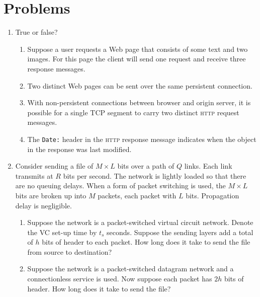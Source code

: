 \documentclass[12pt,a4paper]{article}
\begin{document}
\section{Problems}

\begin{enumerate}

  \item True or false?
  \begin{enumerate}

    \item Suppose a user requests a Web page that consists of some text
      and two images. For this page the client will send one request
      and receive three response messages.

    \item Two distinct Web pages can be sent over the same persistent
      connection.

    \item With non-persistent connections between browser and origin
      ser\-ver, it is possible for a single TCP segment to carry two
      distinct \textsc{http} request messages.

    \item The \verb+Date:+ header in the \textsc{http} response
      message indicates when the object in the response was last
      modified.
   
  \end{enumerate}

  \item Consider sending a file of \(M \times L\) bits over a path of
    \(Q\) links. Each link transmits at \(R\) bits per second. The
    network is lightly loaded so that there are no queuing
    delays. When a form of packet switching is used, the \(M \times
    L\) bits are broken up into \(M\) packets, each packet with \(L\)
    bits. Propagation delay is negligible.
    \begin{enumerate}

      \item Suppose the network is a packet-switched virtual circuit
        network. Denote the VC set-up time by \(t_s\) seconds. Suppose
        the sending layers add a total of \(h\) bits of header to each
        packet. How long does it take to send the file from source to
        destination?

      \item \label{datagram} Suppose the network is a packet-switched
        datagram network and a connectionless service is used. Now
        suppose each packet has \(2h\) bits of header. How long does
        it take to send the file?


\end{enumerate}
\end{enumerate}
\end{document}
